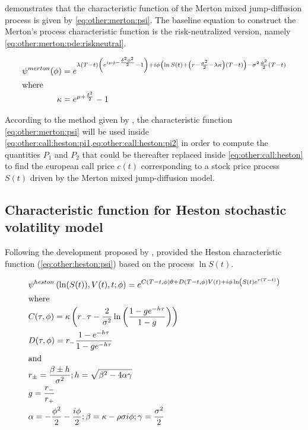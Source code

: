 \documentclass[12pt,a4paper]{report}
\begin{document}
\citet{matsuda2004} demonstrates that the characteristic function of the Merton mixed jump-diffusion process is given by \cref{eq:other:merton:psi}. The baseline equation to construct the Merton's process characteristic function is the risk-neutralized version, namely \cref{eq:other:merton:pde:riskneutral}.

\begin{align}
\psi^{merton}(\phi) &= e^{ 
  \lambda (T - t) \left( e^{i \mu \phi - \frac{\delta^2 \phi^2}{2}} - 1\right) +
  i \phi \left( \ln S(t) + \left(  r - \frac{\sigma^2}{2} - \lambda \kappa \right) (T - t) \right) -
  \sigma^2 \frac{\phi^2}{2} (T - t)
}
\label{eq:other:merton:psi} \\
\intertext{where}
\kappa &= e^{\mu + \frac{\delta^2}{2}} - 1 \notag \\
\end{align}
  
According to the method given by \citet{heston1993}, the characteristic function \ref{eq:other:merton:psi} will be used inside \cref{eq:other:call:heston:pi1,eq:other:call:heston:pi2} in order to compute the quantities $P_1$ and $P_2$ that could be thereafter replaced inside \cref{eq:other:call:heston} to find the european call price  $c(t)$ corresponding to a stock price process $S(t)$ driven by the Merton mixed jump-diffusion model.



\subsection{Characteristic function for Heston stochastic volatility model}
\label{sub:other:option:heston}

Following the development proposed by \citet{gatheral2006}, \citet{criso2015} provided the Heston characteristic function (\cref{eq:other:heston:psi}) based on the process $\ln S(t)$.

\begin{align}
  &\psi^{heston}\left(\ln(S(t)),V(t),t;\phi\right) = e^{C(T-t, \phi)\theta + D(T-t, \phi)V(t) + i\phi\ln\left(S(t)e^{r(T-t)}\right)} \label{eq:other:heston:psi} \\
  \intertext{where}
  &C(\tau, \phi) = \kappa \left(r_{-} \tau - \frac{2}{\sigma^2}\ln\left(\frac{1 - g e^{-h\tau}}{1 - g}\right)\right) \notag \\
  &D(\tau, \phi) = r_{-}\frac{1 - e^{-h\tau}}{1 - ge^{-h\tau}} \notag \\ 
  \intertext{and}
  &r_{\pm} = \frac{\beta \pm h}{\sigma^2}; h = \sqrt{\beta^2 - 4\alpha\gamma} \notag \\
  &g = \frac{r_{-}}{r_{+}} \notag \\
  &\alpha = -\frac{\phi^2}{2} - \frac{i\phi}{2}; \beta = \kappa - \rho\sigma i\phi; \gamma = \frac{\sigma^2}{2} \notag
\end{align}
\end{document}
